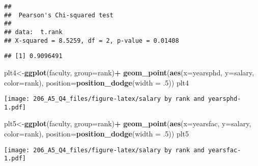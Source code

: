 \documentclass[]{article}
\newenvironment{Shaded}{\begin{snugshade}}{\end{snugshade}}
\newcommand{\KeywordTok}[1]{\textcolor[rgb]{0.13,0.29,0.53}{\textbf{#1}}}
\newcommand{\DataTypeTok}[1]{\textcolor[rgb]{0.13,0.29,0.53}{#1}}
\newcommand{\DecValTok}[1]{\textcolor[rgb]{0.00,0.00,0.81}{#1}}
\newcommand{\StringTok}[1]{\textcolor[rgb]{0.31,0.60,0.02}{#1}}
\newcommand{\CommentTok}[1]{\textcolor[rgb]{0.56,0.35,0.01}{\textit{#1}}}
\newcommand{\OperatorTok}[1]{\textcolor[rgb]{0.81,0.36,0.00}{\textbf{#1}}}
\newcommand{\NormalTok}[1]{#1}
\begin{document}
\begin{verbatim}
## 
##  Pearson's Chi-squared test
## 
## data:  t.rank
## X-squared = 8.5259, df = 2, p-value = 0.01408
\end{verbatim}

\begin{Shaded}
\end{Shaded}

\begin{verbatim}
## [1] 0.9096491
\end{verbatim}

\begin{Shaded}
\end{Shaded}

\begin{Shaded}
\begin{Highlighting}[]
\NormalTok{plt4<-}\KeywordTok{ggplot}\NormalTok{(faculty, }\DataTypeTok{group=}\NormalTok{rank)}\OperatorTok{+}
\StringTok{  }\KeywordTok{geom_point}\NormalTok{(}\KeywordTok{aes}\NormalTok{(}\DataTypeTok{x=}\NormalTok{yearsphd, }\DataTypeTok{y=}\NormalTok{salary, }\DataTypeTok{color=}\NormalTok{rank), }\DataTypeTok{position=}\KeywordTok{position_dodge}\NormalTok{(}\DataTypeTok{width =}\NormalTok{ .}\DecValTok{5}\NormalTok{))}
\NormalTok{plt4}
\end{Highlighting}
\end{Shaded}

\texttt{[image: 206\_A5\_Q4\_files/figure-latex/salary by rank and yearsphd-1.pdf]}

\begin{Shaded}
\begin{Highlighting}[]
\NormalTok{plt5<-}\KeywordTok{ggplot}\NormalTok{(faculty, }\DataTypeTok{group=}\NormalTok{rank)}\OperatorTok{+}
\StringTok{  }\KeywordTok{geom_point}\NormalTok{(}\KeywordTok{aes}\NormalTok{(}\DataTypeTok{x=}\NormalTok{yearsfac, }\DataTypeTok{y=}\NormalTok{salary, }\DataTypeTok{color=}\NormalTok{rank), }\DataTypeTok{position=}\KeywordTok{position_dodge}\NormalTok{(}\DataTypeTok{width =}\NormalTok{ .}\DecValTok{5}\NormalTok{))}
\NormalTok{plt5}
\end{Highlighting}
\end{Shaded}

\texttt{[image: 206\_A5\_Q4\_files/figure-latex/salary by rank and yearsfac-1.pdf]}
\end{document}
